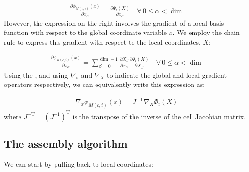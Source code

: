 \documentclass{book}
\begin{document}
\label{\detokenize{6_finite_element_problems:equation-6_finite_element_problems:7}}\begin{equation}\label{equation:6_finite_element_problems:6_finite_element_problems:7}
\begin{split}\frac{\partial\phi_{M(c,i)}(x)}{\partial x_\alpha} =
\frac{\partial\Phi_i(X)}{\partial{x_\alpha}}\quad \forall\, 0\leq \alpha < \dim\end{split}
\end{equation}
However, the expression on the right involves the gradient of a local
basis function with respect to the global coordinate variable \(x\). We
employ the chain rule to express this gradient with respect to the
local coordinates, \(X\):

\label{\detokenize{6_finite_element_problems:equation-6_finite_element_problems:8}}\begin{equation}\label{equation:6_finite_element_problems:6_finite_element_problems:8}
\begin{split}\frac{\partial\phi_{M(c,i)}(x)}{\partial x_\alpha} =
\sum_{\beta=0}^{\dim-1}\frac{\partial X_\beta}{\partial x_\alpha}\frac{\partial\Phi_i(X)}{\partial{X_\beta}}\quad \forall\, 0\leq \alpha < \dim\end{split}
\end{equation}
Using the {\hyperref[\detokenize{5_functions:integration}]{}}, and
using \(\nabla_x\) and \(\nabla_X\) to indicate the global and local
gradient operators respectively, we can equivalently write this
expression as:

\label{\detokenize{6_finite_element_problems:equation-6_finite_element_problems:9}}\begin{equation}\label{equation:6_finite_element_problems:6_finite_element_problems:9}
\begin{split}\nabla_x \phi_{M(c,i)}(x) = J^{-\mathrm{T}}\nabla_X\Phi_i(X)\end{split}
\end{equation}
where \(J^{-\mathrm{T}} = (J^{-1})^\mathrm{T}\) is the transpose of the
inverse of the cell Jacobian matrix.


\subsection{The assembly algorithm}
\label{\detokenize{6_finite_element_problems:the-assembly-algorithm}}
We can start by pulling back {\hyperref[\detokenize{6_finite_element_problems:equation-eq_lhs}]{}} to local coordinates:
\end{document}

